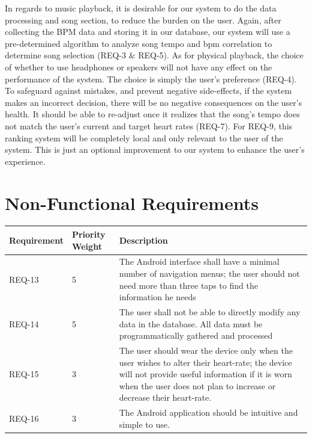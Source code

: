 \documentclass[letterpaper,english, 12pt]{scrreprt}
\begin{document}
In regards to music playback, it is desirable for our system to do the data processing and song section, to reduce the burden on the user. Again, after collecting the BPM data and storing it in our database, our system will use a pre-determined algorithm to analyze song tempo and bpm correlation to determine song selection (REQ-3 & REQ-5). As for physical playback, the choice of whether to use headphones or speakers will not have any effect on the performance of the system. The choice is simply the user's preference (REQ-4).\\

To safeguard against mistakes, and prevent negative side-effects, if the system makes an incorrect decision, there will be no negative consequences on the user's health. It should be able to re-adjust once it realizes that the song's tempo does not match the user's current and target heart rates (REQ-7). For REQ-9, this ranking system will be completely local and only relevant to the user of the system. This is just an optional improvement to our system to enhance the user's experience.\\


\section{Non-Functional Requirements}
\begin{center}
	\begin{tabular}{|C{2cm}|C{2cm}|C{8cm}|}
		\hline
			Requirement & Priority Weight & Description \\
		\hline
			REQ-13 & 5 & The Android interface shall have a minimal number of navigation menus; the user should not need more than three taps to find the information he needs \\
		\hline
			REQ-14 & 5 & The user shall not be able to directly modify any data in the database. All data must be programmatically gathered and processed \\
		\hline
			REQ-15 & 3 & The user should wear the device only when the user wishes to alter their heart-rate; the device will not provide useful information if it is worn when the user does not plan to increase or decrease their heart-rate. \\
		\hline
			REQ-16 & 3 & The Android application should be intuitive and simple to use. \\
		\hline
	\end{tabular}
\end{center}
\end{document}
